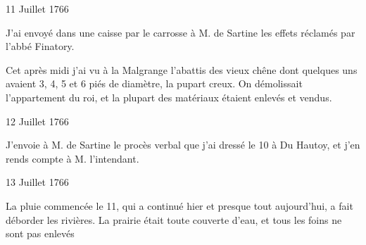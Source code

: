                      \begin{diary}{11 Juillet 1766}{}

                         J'ai envoyé dans une caisse par le carrosse
                           à M. de Sartine les effets
                           réclamés par l'abbé
                              Finatory.
                        \bigskip


                         Cet après midi j'ai vu à la Malgrange
                           l'abattis des vieux chêne dont quelques uns
                           avaient 3, 4, 5 et 6 piés de diamètre, la
                           pupart creux. On démolissait l'appartement du
                           roi, et la plupart des
                           matériaux étaient
                           enlevés et vendus. \bigskip


                     \end{diary}

                     \begin{diary}{12 Juillet 1766}{}

                         J'envoie à M. de Sartine le procès
                           verbal que j'ai
                           dressé le 10 à Du Hautoy, et j'en rends compte
                           à M. l'intendant. \bigskip


                     \end{diary}

                     \begin{diary}{13 Juillet 1766}{}

                         La pluie commencée le 11, qui a continué
                           hier et presque tout aujourd'hui, a fait déborder
                           les rivières. La prairie était toute couverte
                           d'eau, et tous les foins ne sont pas enlevés \bigskip


                     \end{diary}

